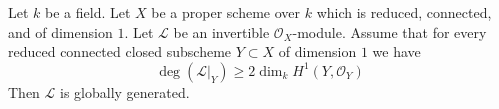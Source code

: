 %
\begin{lemma}
\label{lemma-global-generation}
Let $k$ be a field. Let $X$ be a proper scheme over $k$
which is reduced, connected, and of dimension $1$.
Let $\mathcal{L}$ be an invertible $\mathcal{O}_X$-module.
Assume that for every reduced connected closed subscheme
$Y \subset X$ of dimension $1$ we have
$$
\deg(\mathcal{L}|_Y) \geq 2\dim_k H^1(Y, \mathcal{O}_Y)
$$
Then $\mathcal{L}$ is globally generated.
\end{lemma}

